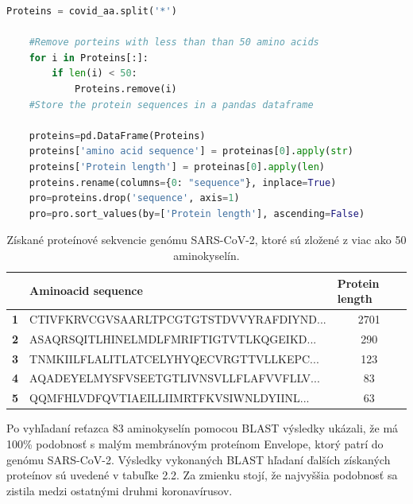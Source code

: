 \begin{lstlisting}[language=Python, caption=Filtrovanie aminokyselinových sekvencií a ich ukladanie do dátového rámca]
    Proteins = covid_aa.split('*')

    #Remove porteins with less than than 50 amino acids
    for i in Proteins[:]:
        if len(i) < 50:
            Proteins.remove(i)
    #Store the protein sequences in a pandas dataframe

    proteins=pd.DataFrame(Proteins)
    proteins['amino acid sequence'] = proteinas[0].apply(str)
    proteins['Protein length'] = proteinas[0].apply(len)
    proteins.rename(columns={0: "sequence"}, inplace=True)
    pro=proteins.drop('sequence', axis=1)
    pro=pro.sort_values(by=['Protein length'], ascending=False)
\end{lstlisting}

\begin{table}[]
    \caption{Získané proteínové sekvencie genómu SARS-CoV-2, ktoré sú zložené z viac ako 50 aminokyselín.}\label{t:1}
	\smallskip
	\centering
    
    \begin{tabular}{|l|l|c|}
    \hline
    \textbf{ } & \textbf{Aminoacid sequence}                                                     & \multicolumn{1}{l|}{\textbf{Protein length}} \\ \hline
    \textbf{1} & CTIVFKRVCGVSAARLTPCGTGTSTDVVYRAFDIYND... & 2701                                         \\ \hline
    \textbf{2} & ASAQRSQITLHINELMDLFMRIFTIGTVTLKQGEIKD... & 290                                          \\ \hline
    \textbf{3} & TNMKIILFLALITLATCELYHYQECVRGTTVLLKEPC... & 123                                          \\ \hline
    \textbf{4} & AQADEYELMYSFVSEETGTLIVNSVLLFLAFVVFLLV... & 83                                           \\ \hline
    \textbf{5} & QQMFHLVDFQVTIAEILLIIMRTFKVSIWNLDYIINL... & 63                                           \\ \hline
    \end{tabular}
\end{table}

Po vyhľadaní reťazca 83 aminokyselín pomocou BLAST výsledky ukázali, že má 100\% podobnosť s malým membránovým proteínom Envelope, ktorý patrí do genómu SARS-CoV-2.
Výsledky vykonaných BLAST hľadaní ďalších získaných proteínov sú uvedené v tabuľke 2.2.
Za zmienku stojí, že najvyššia podobnosť sa zistila medzi ostatnými druhmi koronavírusov.

